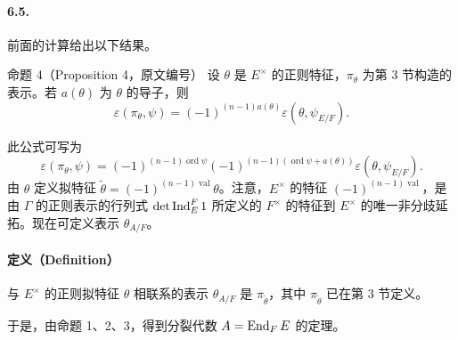 \paragraph*{6.5.}前面的计算给出以下结果。
\begin{originaltheorem}{命题 4（Proposition 4，原文编号）}
设 $\theta$ 是 $E^\times$ 的正则特征，$\pi_\theta$ 为第 3 节构造的表示。若 $a(\theta)$ 为 $\theta$ 的导子，则
\[
\varepsilon(\pi_\theta,\psi)=(-1)^{(n-1)a(\theta)}\varepsilon(\theta,\psi_{E/F}).
\]
\end{originaltheorem}
此公式可写为
\[
\varepsilon(\pi_\theta,\psi)=(-1)^{(n-1)\operatorname{ord}\psi}
(-1)^{(n-1)(\operatorname{ord}\psi+a(\theta))}\varepsilon(\theta,\psi_{E/F}).
\]
由 $\theta$ 定义拟特征 $\widetilde\theta=(-1)^{(n-1)\operatorname{val}}\theta$。注意，$E^\times$ 的特征 $(-1)^{(n-1)\operatorname{val}}$，是由 $\Gamma$ 的正则表示的行列式 $\det\operatorname{Ind}_E^F1$ 所定义的 $F^\times$ 的特征到 $E^\times$ 的唯一非分歧延拓。现在可定义表示 $\theta_{A/F}$。

\paragraph*{定义（Definition）}与 $E^\times$ 的正则拟特征 $\theta$ 相联系的表示 $\theta_{A/F}$ 是 $\pi_{\widetilde\theta}$，其中 $\pi_{\widetilde\theta}$ 已在第 3 节定义。

于是，由命题 1、2、3，得到分裂代数 $A=\operatorname{End}_FE$ 的定理。

